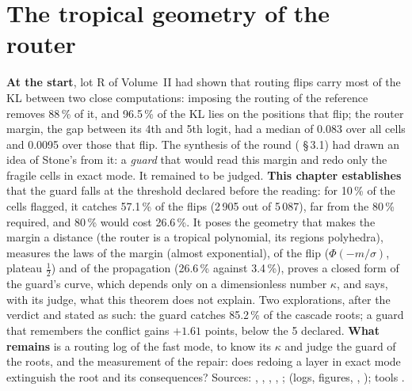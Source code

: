 
\chapter{The tropical geometry of the router}\label{t3tro:ch}

\begin{origine}
\textbf{At the start}, lot R of Volume~II had shown that routing flips carry most of the KL between two close computations: imposing the routing of the reference removes 88\,\% of it, and 96.5\,\% of the KL lies on the positions that flip; the router margin, the gap between its 4th and 5th logit, had a median of 0.083 over all cells and 0.0095 over those that flip. The synthesis of the round ( §\,3.1) had drawn an idea of Stone's from it: a \emph{guard} that would read this margin and redo only the fragile cells in exact mode. It remained to be judged.
\textbf{This chapter establishes} that the guard falls at the threshold declared before the reading: for 10\,\% of the cells flagged, it catches 57.1\,\% of the flips (2\,905 out of 5\,087), far from the 80\,\% required, and 80\,\% would cost 26.6\,\%. It poses the geometry that makes the margin a distance (the router is a tropical polynomial, its regions polyhedra), measures the laws of the margin (almost exponential), of the flip ($\Phi(-m/\sigma)$, plateau $\tfrac12$) and of the propagation (26.6\,\% against 3.4\,\%), proves a closed form of the guard's curve, which depends only on a dimensionless number $\kappa$, and says, with its judge, what this theorem does not explain. Two explorations, after the verdict and stated as such: the guard catches 85.2\,\% of the cascade roots; a guard that remembers the conflict gains $+1.61$ points, below the 5 declared.
\textbf{What remains} is a routing log of the fast mode, to know its $\kappa$ and judge the guard of the roots, and the measurement of the repair: does redoing a layer in exact mode extinguish the root and its consequences?
Sources: , , , , ;  (logs, figures, , ); tools .
\end{origine}

